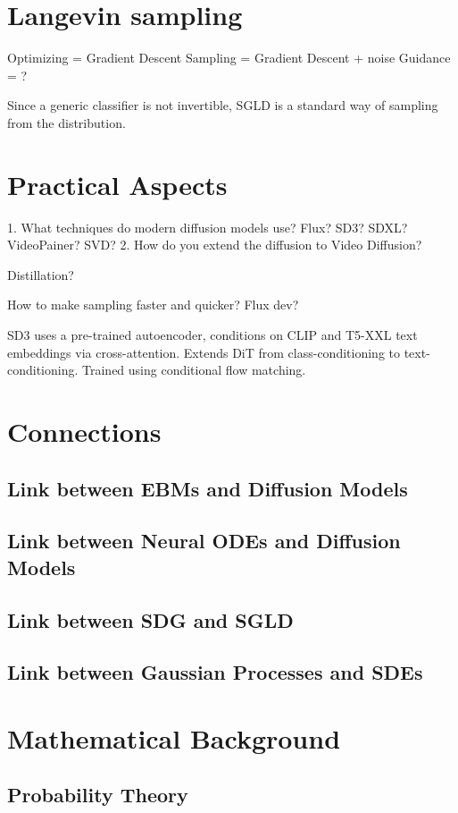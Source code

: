 \documentclass[a4paper, 11pt]{article}
\begin{document}
\section{Langevin sampling}


Optimizing = Gradient Descent
Sampling = Gradient Descent + noise
Guidance = ?

Since a generic classifier is not invertible, SGLD is a standard way of sampling from the distribution.

\section{Practical Aspects}


1. What techniques do modern diffusion models use? Flux? SD3? SDXL? VideoPainer? SVD?
2. How do you extend the diffusion to Video Diffusion?

Distillation?

How to make sampling faster and quicker? Flux dev?


SD3 uses a pre-trained autoencoder, conditions on CLIP and T5-XXL text embeddings via cross-attention. Extends DiT from class-conditioning to text-conditioning. Trained using conditional flow matching.



\section{Connections}
\subsection{Link between EBMs and Diffusion Models}
\subsection{Link between Neural ODEs and Diffusion Models}
\subsection{Link between SDG and SGLD}
\subsection{Link between Gaussian Processes and SDEs}

\appendix
\section{Mathematical Background}
\subsection{Probability Theory}


 

\end{document}
